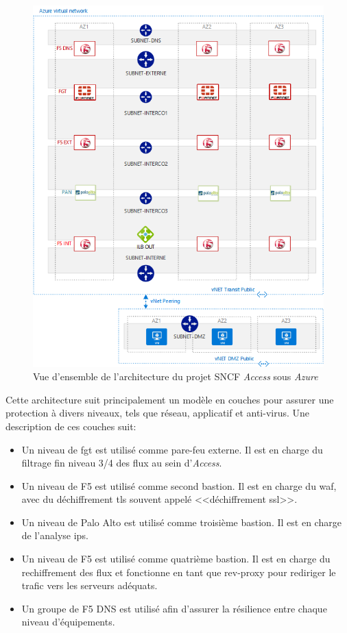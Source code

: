 \documentclass[12pt, oneside, a4paper, titlepage]{report}
\begin{document}
\begin{figure}[h!]
    \centering
    \includegraphics[width = 0.9\linewidth]{img/sncf-access/arch.png}
    \caption{%
        Vue d'ensemble de l'architecture du projet SNCF \textit{Access} sous
        \textit{Azure}%
    }%
    \label{fig:sncf-access/arch}
\end{figure}

Cette architecture suit principalement un modèle en couches pour assurer une
protection à divers niveaux, tels que réseau, applicatif et anti-virus. Une
description de ces couches suit:

\begin{itemize}
    \item Un niveau de \acrlong{fgt} est utilisé comme pare-feu externe. Il est
        en charge du filtrage fin niveau 3/4 des flux au sein d'\textit{Access}.
    \item Un niveau de F5 est utilisé comme second bastion. Il est en charge du
        \gls{waf}, avec du déchiffrement \gls{tls} souvent appelé
        <<déchiffrement \gls{ssl}>>.
    \item Un niveau de Palo Alto est utilisé comme troisième bastion. Il est en
        charge de l'analyse \gls{ips}.
    \item Un niveau de F5 est utilisé comme quatrième bastion. Il est en charge
        du rechiffrement des flux et fonctionne en tant que \gls{rev-proxy} pour
        rediriger le trafic vers les serveurs adéquats.
    \item Un groupe de F5 DNS est utilisé afin d'assurer la résilience entre
        chaque niveau d'équipements.
\end{itemize}
\end{document}
